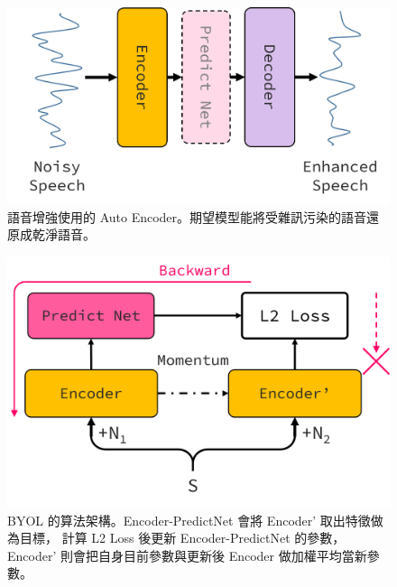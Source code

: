 \documentclass[10pt,twocolumn,letterpaper]{article}
\begin{document}
\begin{CJK}{UTF8}{bkai}




   \begin{figure}[t]
      \begin{center}
         \includegraphics[width=0.8\linewidth]{img/auto-encoder.png}
      \end{center}
      \caption{
         語音增強使用的 Auto Encoder。期望模型能將受雜訊污染的語音還原成乾淨語音。
      }
      \label{fig:long}
      \label{fig:onecol}
   \end{figure}

   \begin{figure}[t]
      \begin{center}
         \includegraphics[width=0.8\linewidth]{img/BYOL.png}
      \end{center}
      \caption{
         BYOL 的算法架構。Encoder-PredictNet 會將 Encoder' 取出特徵做為目標，
         計算 L2 Loss 後更新 Encoder-PredictNet 的參數，
         Encoder' 則會把自身目前參數與更新後 Encoder 做加權平均當新參數。
      }
      \label{fig:long}
      \label{fig:onecol}
   \end{figure}


\end{CJK}
\end{document}
